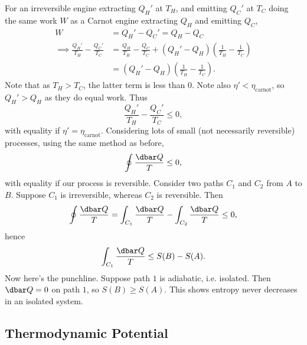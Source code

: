 \documentclass[12pt]{article}
\begin{document}
For an irreversible engine extracting $Q_H'$ at $T_H$, and emitting $Q_C'$ at $T_C$ doing the same work $W$ as a Carnot engine extracting $Q_H$ and emitting $Q_C$,
\begin{align*}
	W &= Q_H' - Q_C' = Q_H - Q_C \\
	\implies \frac{Q_H'}{T_H} - \frac{Q_C'}{T_C} &= \frac{Q_H}{T_H} - \frac{Q_C}{T_C} + (Q_H' - Q_H) \left( \frac{1}{T_H} - \frac{1}{T_C} \right)\\
										 &= (Q_H' - Q_H) \left( \frac{1}{T_H} - \frac{1}{T_C}\right).
\end{align*}
Note that as $T_H > T_C$, the latter term is less than $0$. Note also $\eta' < \eta_{\mathrm{carnot}}$, so $Q_H' > Q_H$ as they do equal work. Thus
\[
\frac{Q_H'}{T_H} - \frac{Q_C'}{T_C} \leq 0,
\]
with equality if $\eta' = \eta_{\mathrm{carnot}}$. Considering lots of small (not necessarily reversible) processes, using the same method as before,
\[
\oint \frac{\dbar Q}{T} \leq 0,
\]
with equality if our process is reversible. Consider two paths $C_1$ and $C_2$ from $A$ to $B$. Suppose $C_1$ is irreversible, whereas $C_2$ is reversible. Then
\[
\oint \frac{\dbar Q}{T} = \int_{C_1} \frac{\dbar Q}{T} - \int_{C_2} \frac{\dbar Q}{T} \leq 0,
\]
hence
\[
\int_{C_1} \frac{\dbar Q}{T} \leq S(B) - S(A).
\]
Now here's the punchline. Suppose path $1$ is adiabatic, i.e. isolated. Then $\dbar Q = 0$ on path $1$, so $S(B) \geq S(A)$. This shows entropy never decreases in an isolated system.

\subsection{Thermodynamic Potential}
\label{sub:thm_pot}
\end{document}
